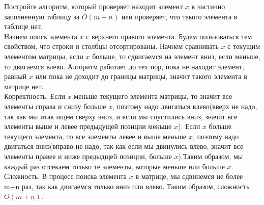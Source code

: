 \documentclass[12pt]{extreport}
\theoremstyle{definiton}
\theoremstyle{definition}
\theoremstyle{definition}
\newcounter{problem}
\newcounter{subproblem}
\def\PRSUBskip{
	\medskip
}
\def\prsub{\PRSUBskip\noindent\stepcounter{subproblem}{\sf \thesubproblem.}\;}
\begin{document}
	 \prsub Постройте алгоритм, который проверяет находит элемент $x$ в  частично заполненную таблицу за $O(m+n)$ или проверяет, что такого элемента в таблице нет.
	 \newline
	 \\Начнем поиск элемента $x$ с верхнего правого элемента. Будем пользоваться тем свойством, что строки и столбцы отсортированы. Начнем сравнивать $x$ с текущим элементом матрицы, если $x$ больше, то сдвигаемся на элемент вниз, если меньше, то двигаемся влево. Алгоритм работает до тех пор, пока не находит элемент, равный $x$ или пока не доходит до границы матрицы, значит такого элемента в матрице нет.
	 \\Корректность. Если $x$ меньше текущего элемента матрицы, то значит все элементы справа и снизу больше $x$, поэтому надо двигаться влево(вверх не надо, так как мы итак ищем сверху вниз, и если мы спустились вниз, значит все элементы выше и левее предыдущей позиции меньше $x$). Если $x$ больше текущего элемента, то все элементы левее и выше меньше $x$, поэтому надо двигаться вниз(вправо не надо, так как если мы двинулись влево, значит все элементы правее и ниже предыдщей позиции, больше $x$).Таким образом, мы каждый раз отсекаем только те элементы, которые меньше или больше $x$.
	 \\ Сложность. В процесс поиска элемента $x$ в матрице, мы сдвинемся не более m+n раз, так как двигаемся только вниз или влево. Таким образом, сложность $O(m+n)$.
\end{document}
